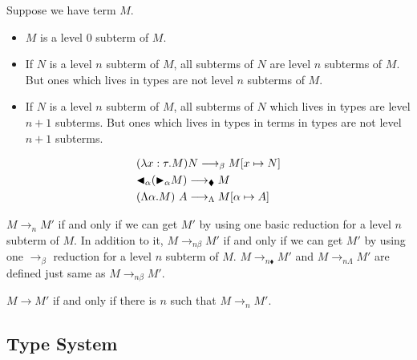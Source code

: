 
Suppose we have term \( M \).
\begin{itemize}
    \item \( M \) is a level 0 subterm of \( M \).
    \item If \( N \) is a level \( n \) subterm of \( M \), all subterms of \(
        N \) are level \( n \) subterms of \( M \). But ones which lives in
        types are not level \( n \) subterms of \( M \).
    \item If \( N \) is a level \( n \) subterm of \( M \), all subterms of \(
        N \) which lives in types are level \( n + 1 \) subterms. But ones
        which lives in types in terms in types are not level \( n + 1 \)
        subterms.
\end{itemize}

\begin{center}
  \begin{align*}
     & (\lambda x:\tau.M) N \longrightarrow_\beta M[x \mapsto N]         \\
     & {\mathop{\blacktriangleleft}}_\alpha ({\mathop{\blacktriangleright}}_\alpha M)\longrightarrow_\blacklozenge M         \\
     & (\Lambda \alpha.M)\ A \longrightarrow_\Lambda M[\alpha \mapsto A]
  \end{align*}
\end{center}

\( M \longrightarrow_n M' \) if and only if we can get \( M' \) by using one
basic reduction for a level \( n \) subterm of \( M \).  In addition to it, \(
M \longrightarrow_{n\beta} M' \) if and only if we can get \( M' \) by using
one \( \longrightarrow_\beta \) reduction for a level \( n \) subterm of \( M
\).  \( M \longrightarrow_{n\blacklozenge} M' \) and \( M
\longrightarrow_{n\Lambda} M' \) are defined just same as \( M
\longrightarrow_{n\beta} M' \).

\( M \longrightarrow M' \) if and only if there is \( n \) such that \( M
\longrightarrow_n M' \).

\subsection{Type System}

  \begin{center}
    \infrule{
    }{
      \vdash \emptyset
    }
    \hfil
    \\[2mm]
  \end{center}

